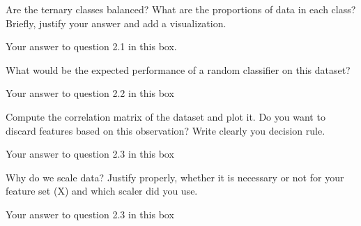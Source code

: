 
\begin{question}{2.1}
Are the ternary classes balanced? What are the proportions of data in each class? Briefly, justify your answer and add a visualization. 
\end{question}

\begin{answer}{10} 
    Your answer to question 2.1 in this box.\\
\end{answer}





\begin{question}{2.2}
What would be the expected performance of a random classifier on this dataset? 
\end{question}

\begin{answer}{2.5} 
    Your answer to question 2.2 in this box
\end{answer}



\begin{question}{2.3}
Compute the correlation matrix of the dataset and plot it. Do you want to discard features based on this observation?
Write clearly you decision rule. 
\end{question}

\begin{answer}{18} 
    Your answer to question 2.3 in this box
\end{answer}



\begin{question}{2.4}
 Why do we scale data? Justify properly, whether it is necessary or not for your feature set (X) and which scaler did you use. 
\end{question}

\begin{answer}{8} 
    Your answer to question 2.3 in this box
\end{answer}

